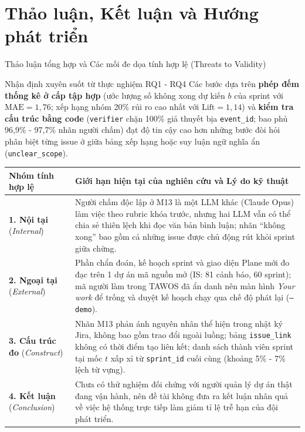 \section{Thảo luận, Kết luận và Hướng phát triển}

\begin{frame}{Thảo luận tổng hợp và Các mối đe dọa tính hợp lệ (Threats to Validity)}
  \scriptsize
  \begin{block}{Nhận định xuyên suốt từ thực nghiệm RQ1 - RQ4}
    Các bước dựa trên \textbf{phép đếm thống kê ở cấp tập hợp} (ước lượng số không xong dự kiến $b$ của sprint với $\text{MAE} = 1{,}76$; xếp hạng nhóm 20\% rủi ro cao nhất với $\text{Lift} = 1{,}14$) và \textbf{kiểm tra cấu trúc bằng code} (\texttt{verifier} chặn 100\% giả thuyết bịa \texttt{event\_id}; bao phủ 96,9\% - 97,7\% nhãn người chấm) đạt độ tin cậy cao hơn những bước đòi hỏi phân biệt từng issue ở giữa bảng xếp hạng hoặc suy luận ngữ nghĩa ẩn (\texttt{unclear\_scope}).
  \end{block}
  \vspace{0.08cm}
  \setlength{\tabcolsep}{4pt}
  \renewcommand{\arraystretch}{1.22}
  \begin{tabular}{L{0.21\textwidth}|L{0.75\textwidth}}
    \textbf{Nhóm tính hợp lệ} & \textbf{Giới hạn hiện tại của nghiên cứu và Lý do kỹ thuật} \\
    \hline
    \textbf{1. Nội tại} (\emph{Internal}) & Người chấm độc lập ở M13 là một LLM khác (Claude Opus) làm việc theo rubric khóa trước, nhưng hai LLM vẫn có thể chia sẻ thiên lệch khi đọc văn bản bình luận; nhãn ``không xong'' bao gồm cả những issue được chủ động rút khỏi sprint giữa chừng. \\
    \hline
    \textbf{2. Ngoại tại} (\emph{External}) & Phần chẩn đoán, kế hoạch sprint và giao diện Plane mới đo đạc trên 1 dự án mã nguồn mở (IS: 81 cảnh báo, 60 sprint); mã người làm trong TAWOS đã ẩn danh nên màn hình \emph{Your work} để trống và duyệt kế hoạch chạy qua chế độ phát lại (\texttt{--demo}). \\
    \hline
    \textbf{3. Cấu trúc đo} (\emph{Construct}) & Nhãn M13 phản ánh nguyên nhân thể hiện trong nhật ký Jira, không bao gồm trao đổi ngoài luồng; bảng \texttt{issue\_link} không có thời điểm tạo liên kết; danh sách thành viên sprint tại mốc $t$ xấp xỉ từ \texttt{sprint\_id} cuối cùng (khoảng 5\% - 7\% lệch từ vựng). \\
    \hline
    \textbf{4. Kết luận} (\emph{Conclusion}) & Chưa có thử nghiệm đối chứng với người quản lý dự án thật đang vận hành, nên đề tài không đưa ra kết luận nhân quả về việc hệ thống trực tiếp làm giảm tỉ lệ trễ hạn của đội phát triển. \\
  \end{tabular}
\end{frame}

